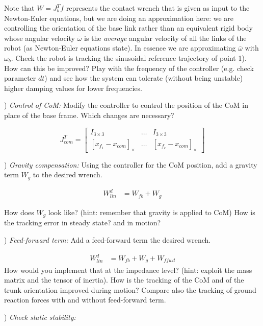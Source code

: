 \documentclass{report}
\newcommand{\mat}[1]{\ensuremath{\begin{bmatrix}#1\end{bmatrix}}}	%
\begin{document}
Note that $W = J_b^Tf$ represents the contact wrench that is given as input to the Newton-Euler equations, but we are doing an approximation here: we are controlling the orientation of the base link rather than an equivalent rigid body whose angular velocity $\bar{\omega}$ is the \textit{average} angular velocity of all the links of the robot (as Newton-Euler equations state). In essence we are approximating  $\bar{\omega}$ with ${\omega}_b$.
Check the robot is tracking the sinusoidal reference trajectory of point 1). How can this be improved? Play with the frequency of the controller (e.g. check parameter $dt$) and see how the system can tolerate (without being unstable)  higher damping values for lower frequencies.

\quad

) \textit{Control of CoM:}
Modify the controller to control the position of the CoM in place of the base frame.
Which changes are necessary?


\begin{equation}
J_{com}^T = \mat{I_{3\times3} & \dots & I_{3\times3} \\
	[x_{f_1} - x_{com}]_{\times} & \dots & [x_{f_c} - x_{com}]_{\times}}
\end{equation}

) \textit{Gravity compensation:}
Using the controller for the CoM position, add a gravity term $W_g$ to the desired wrench.

\begin{align}
W^d_{lin} &= W_{fb} +  W_g
\end{align}

How does $W_g$ look like? (hint: remember that gravity is applied to CoM)
How is the tracking error in steady state? and in motion?

\quad

) \textit{Feed-forward term:}
Add a feed-forward term the desired wrench. 

\begin{align}
W^d_{lin} &= W_{fb} +  W_g + W_{ffwd}
\end{align}
How would you implement that at the impedance level? (hint: exploit the mass matrix and the tensor of inertia).
How is the tracking of the CoM and of the trunk orientation improved during motion? 
Compare also the tracking of ground reaction  forces with and without feed-forward term.

\quad

) \textit{Check static stability:}
\end{document}
